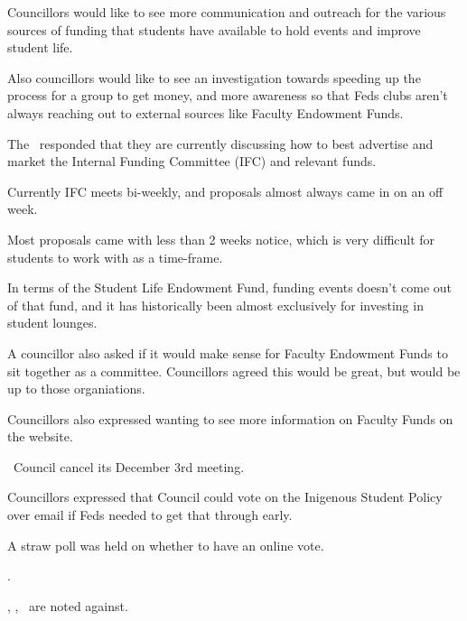 \begin{information}
    Councillors would like to see more communication and outreach for the 
    various sources of funding that students have available to hold events
    and improve student life. 

    Also councillors would like to see an investigation towards speeding up the
    process for a group to get money, and more awareness so that Feds clubs
    aren't always reaching out to external sources like Faculty Endowment 
    Funds. 

    The \vpi\ responded that they are currently discussing how to best
    advertise and market the Internal Funding Committee (IFC) and relevant
    funds. 
    
    Currently IFC meets bi-weekly, and proposals almost always came in on an
    off week.

    Most proposals came with less than 2 weeks notice, which is very difficult
    for students to work with as a time-frame. 

    In terms of the Student Life Endowment Fund, funding events doesn't come
    out of that fund, and it has historically been almost exclusively for
    investing in student lounges.

    A councillor also asked if it would make sense for Faculty Endowment Funds
    to sit together as a committee. Councillors agreed this would be great,
    but would be up to those organiations. 

    Councillors also expressed wanting to see more information on Faculty
    Funds on the website.
    
\end{information}

\begin{information}
    \birt\ Council cancel its December 3rd meeting.
    \movers{\elizabeth}{\seneca}

    Councillors expressed that Council could vote on the Inigenous Student
    Policy over email if Feds needed to get that through early.

    A straw poll was held on whether to have an online vote.

    \carries.

    \jason, \alexander, \stephanie\ are noted against.
\end{information}
